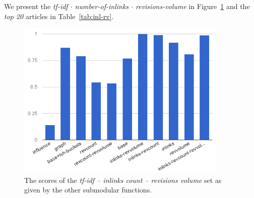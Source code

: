We present the \emph{tf-idf \(\cdot\) number-of-inlinks \(\cdot\)
revisions-volume} in Figure~\ref{img:inl-rv} and the \emph{top 20} articles in
Table~\ref{tab:inl-rv}.
\begin{figure}
  \centering
  \includegraphics[width=0.9\textwidth,natwidth=555,natheight=419]{images/inl-rv.png}
  \caption{The scores of the \emph{tf-idf -- inlinks count -- revisions volume}
  set as given by the other submodular functions.}
  \label{img:inl-rv}
\end{figure}

